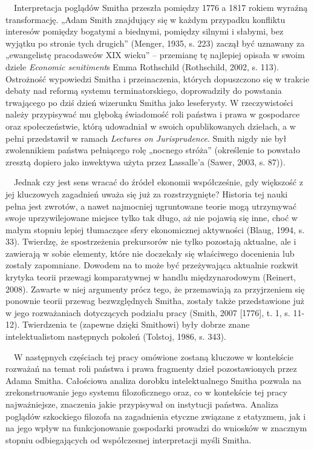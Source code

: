 \documentclass[a4paper]{article}
\begin{document}
 \ \ Interpretacja poglądów Smitha przeszła pomiędzy 1776 a 1817 rokiem wyraźną transformację. „Adam Smith znajdujący się w każdym przypadku konfliktu interesów pomiędzy bogatymi a biednymi, pomiędzy silnymi i słabymi, bez wyjątku po stronie tych drugich” \label{ref:RNDsAFNZfRokB}(Menger, 1935, s. 223) zaczął być uznawany za „ewangelistę pracodawców XIX wieku” – przemianę tę najlepiej opisała w swoim dziele \textit{Economic senitiment}s Emma Rothschild \label{ref:RNDs0eUTXaI1v}(Rothschild, 2002, s. 113). Ostrożność wypowiedzi Smitha i przeinaczenia, których dopuszczono się w trakcie debaty nad reformą systemu terminatorskiego, doprowadziły do powstania trwającego po dziś dzień wizerunku Smitha jako leseferysty. W rzeczywistości należy przypisywać mu głęboką świadomość roli państwa i prawa w gospodarce oraz społeczeństwie, którą udowadniał w swoich opublikowanych dziełach, a w pełni przedstawił w ramach \textit{Lectures on Jurisprudence}. Smith nigdy nie był zwolennikiem państwa pełniącego rolę „nocnego stróża” (określenie to powstało zresztą dopiero jako inwektywa użyta przez Lassalle’a \label{ref:RNDPvkhPhffGM}(Sawer, 2003, s. 87)).

\ \ Jednak czy jest sens wracać do źródeł ekonomii współcześnie, gdy większość z jej kluczowych zagadnień uważa się już za rozstrzygnięte? Historia tej nauki pełna jest zwrotów, a nawet najmocniej ugruntowane teorie mogą utrzymywać swoje uprzywilejowane miejsce tylko tak długo, aż nie pojawią się inne, choć w małym stopniu lepiej tłumaczące sfery ekonomicznej aktywności \label{ref:RNDIzKebFVZYU}(Blaug, 1994, s. 33). Twierdzę, że spostrzeżenia prekursorów nie tylko pozostają aktualne, ale i zawierają w sobie elementy, które nie doczekały się właściwego docenienia lub zostały zapomniane. Dowodem na to może być przeżywająca aktualnie rozkwit krytyka teorii przewagi komparatywnej w handlu międzynarodowym \label{ref:RNDCycJKXS8KA}(Reinert, 2008). Zawarte w niej argumenty prócz tego, że przemawiają za przyjrzeniem się ponownie teorii przewag bezwzględnych Smitha, zostały także przedstawione już w jego rozważaniach dotyczących podziału pracy \label{ref:RNDtOabovEKbm}(Smith, 2007 [1776], t. 1, s. 11-12). Twierdzenia te (zapewne dzięki Smithowi) były dobrze znane intelektualistom następnych pokoleń \label{ref:RND8shRFO5Ofw}(Tolstoj, 1986, s. 343).

\ \ W następnych częściach tej pracy omówione zostaną kluczowe w kontekście rozważań na temat roli państwa i prawa fragmenty dzieł pozostawionych przez Adama Smitha. Całościowa analiza dorobku intelektualnego Smitha pozwala na zrekonstruowanie jego systemu filozoficznego oraz, co w kontekście tej pracy najważniejsze, znaczenia jakie przypisywał on instytucji państwa. Analiza poglądów szkockiego filozofa na zagadnienia etyczne związane z etatyzmem, jak i na jego wpływ na funkcjonowanie gospodarki prowadzi do wniosków w znacznym stopniu odbiegających od współczesnej interpretacji myśli Smitha.
\end{document}
